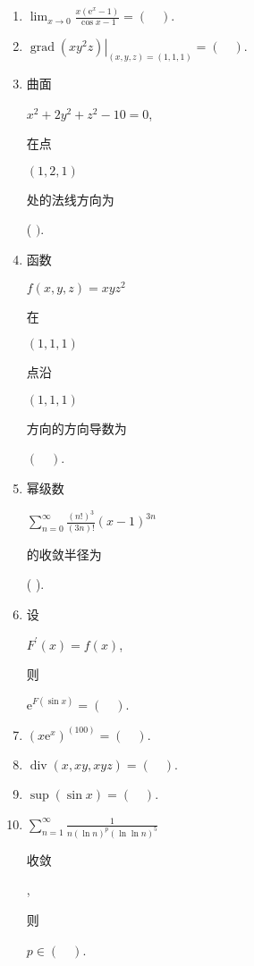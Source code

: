 \documentclass[10pt]{article}
\begin{document}
\begin{enumerate}
  \item $\lim _{x \rightarrow 0} \frac{x\left(\mathrm{e}^{x}-1\right)}{\cos x-1}=(\quad)$.

  \item $\left.\operatorname{grad}\left(x y^{2} z\right)\right|_{(x, y, z)=(1,1,1)}=(\quad)$.

  \item \begin{CJK}{UTF8}{mj}曲面\end{CJK} $x^{2}+2 y^{2}+z^{2}-10=0$, \begin{CJK}{UTF8}{mj}在点\end{CJK} $(1,2,1)$ \begin{CJK}{UTF8}{mj}处的法线方向为\end{CJK} ( $)$.

  \item \begin{CJK}{UTF8}{mj}函数\end{CJK} $f(x, y, z)=x y z^{2}$ \begin{CJK}{UTF8}{mj}在\end{CJK} $(1,1,1)$ \begin{CJK}{UTF8}{mj}点沿\end{CJK} $(1,1,1)$ \begin{CJK}{UTF8}{mj}方向的方向导数为\end{CJK} $(\quad)$.

  \item \begin{CJK}{UTF8}{mj}幂级数\end{CJK} $\sum_{n=0}^{\infty} \frac{(n !)^{3}}{(3 n) !}(x-1)^{3 n}$ \begin{CJK}{UTF8}{mj}的收敛半径为\end{CJK} ( ).

  \item \begin{CJK}{UTF8}{mj}设\end{CJK} $F^{\prime}(x)=f(x)$, \begin{CJK}{UTF8}{mj}则\end{CJK} $\mathrm{e}^{F(\sin x)}=(\quad)$.

  \item $\left(x \mathrm{e}^{x}\right)^{(100)}=(\quad) .$

  \item $\operatorname{div}(x, x y, x y z)=(\quad)$.

  \item $\sup (\sin x)=(\quad)$.

  \item $\sum_{n=1}^{\infty} \frac{1}{n(\ln n)^{p}(\ln \ln n)^{5}}$ \begin{CJK}{UTF8}{mj}收敛\end{CJK}, \begin{CJK}{UTF8}{mj}则\end{CJK} $p \in(\quad)$.

\end{enumerate}
\end{document}
